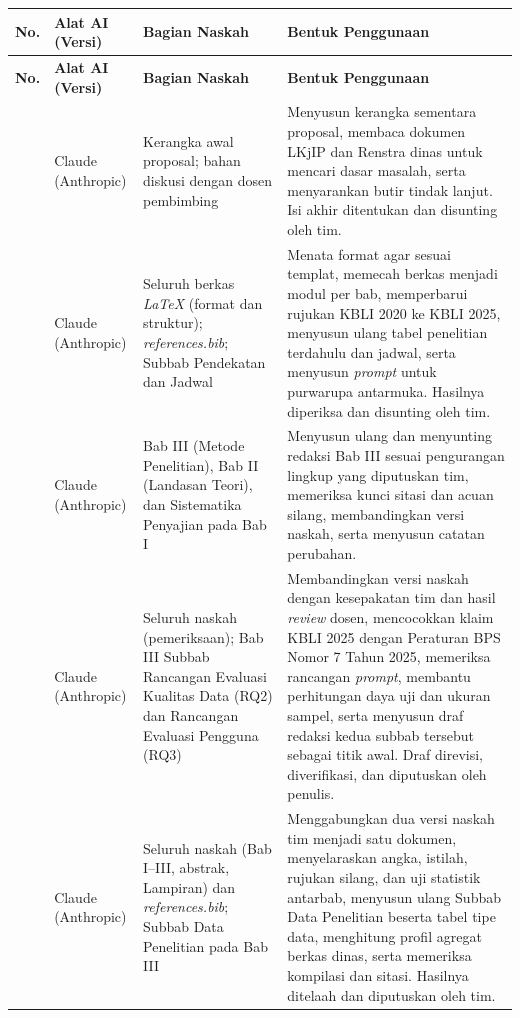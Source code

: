 \begin{spacing}{1.15}
\begin{longtable}{|>{\centering\arraybackslash}p{}|L{0.17\textwidth}|L{0.24\textwidth}|L{0.38\textwidth}|}
\hline
\textbf{No.} & \textbf{Alat AI (Versi)} & \textbf{Bagian Naskah} & \textbf{Bentuk Penggunaan} \\ \hline
\endfirsthead
\hline
\textbf{No.} & \textbf{Alat AI (Versi)} & \textbf{Bagian Naskah} & \textbf{Bentuk Penggunaan} \\ \hline
{} & Claude (Anthropic) & Kerangka awal proposal; bahan diskusi dengan dosen pembimbing & Menyusun kerangka sementara proposal, membaca dokumen LKjIP dan Renstra dinas untuk mencari dasar masalah, serta menyarankan butir tindak lanjut. Isi akhir ditentukan dan disunting oleh tim. \\  & Claude (Anthropic) & Seluruh berkas \textit{LaTeX} (format dan struktur); \textit{references.bib}; Subbab Pendekatan dan Jadwal & Menata format agar sesuai templat, memecah berkas menjadi modul per bab, memperbarui rujukan KBLI 2020 ke KBLI 2025, menyusun ulang tabel penelitian terdahulu dan jadwal, serta menyusun \textit{prompt} untuk purwarupa antarmuka. Hasilnya diperiksa dan disunting oleh tim. \\  & Claude (Anthropic) & Bab III (Metode Penelitian), Bab II (Landasan Teori), dan Sistematika Penyajian pada Bab I & Menyusun ulang dan menyunting redaksi Bab III sesuai pengurangan lingkup yang diputuskan tim, memeriksa kunci sitasi dan acuan silang, membandingkan versi naskah, serta menyusun catatan perubahan. \\  & Claude (Anthropic) & Seluruh naskah (pemeriksaan); Bab III Subbab Rancangan Evaluasi Kualitas Data (RQ2) dan Rancangan Evaluasi Pengguna (RQ3) & Membandingkan versi naskah dengan kesepakatan tim dan hasil \textit{review} dosen, mencocokkan klaim KBLI 2025 dengan Peraturan BPS Nomor 7 Tahun 2025, memeriksa rancangan \textit{prompt}, membantu perhitungan daya uji dan ukuran sampel, serta menyusun draf redaksi kedua subbab tersebut sebagai titik awal. Draf direvisi, diverifikasi, dan diputuskan oleh penulis. \\  & Claude (Anthropic) & Seluruh naskah (Bab I--III, abstrak, Lampiran) dan \textit{references.bib}; Subbab Data Penelitian pada Bab III & Menggabungkan dua versi naskah tim menjadi satu dokumen, menyelaraskan angka, istilah, rujukan silang, dan uji statistik antarbab, menyusun ulang Subbab Data Penelitian beserta tabel tipe data, menghitung profil agregat berkas dinas, serta memeriksa kompilasi dan sitasi. Hasilnya ditelaah dan diputuskan oleh tim. \\ \hline
\end{longtable}


\end{spacing}
